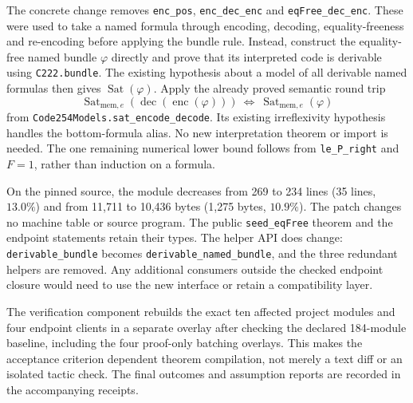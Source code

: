 The concrete change removes \texttt{enc\_pos}, \texttt{enc\_dec\_enc} and
\texttt{eqFree\_dec\_enc}. These were used to take a named formula through
encoding, decoding, equality-freeness and re-encoding before applying the
bundle rule. Instead, construct the equality-free named bundle $\varphi$
directly and prove that its interpreted code is derivable using
\texttt{C222.bundle}. The existing hypothesis about a model of all derivable
named formulas then gives $\operatorname{Sat}(\varphi)$. Apply the already proved
semantic round trip
\[
 \operatorname{Sat}_{\mathrm{mem},e}
       (\operatorname{dec}(\operatorname{enc}(\varphi)))
 \ \Longleftrightarrow\
 \operatorname{Sat}_{\mathrm{mem},e}(\varphi)
\]
from \texttt{Code254Models.sat\_encode\_decode}. Its existing irreflexivity
hypothesis handles the bottom-formula alias. No new interpretation theorem or
import is needed. The one remaining numerical lower bound follows from
\texttt{le\_P\_right} and $F=1$, rather than induction on a formula.

On the pinned source, the module decreases from 269 to 234 lines
(35 lines, $13.0\%$) and from 11,711 to 10,436 bytes
(1,275 bytes, $10.9\%$). The patch changes no machine table or source program.
The public \texttt{seed\_eqFree} theorem and the endpoint statements retain
their types. The helper API does change: \texttt{derivable\_bundle} becomes
\texttt{derivable\_named\_bundle}, and the three redundant helpers are removed.
Any additional consumers outside the checked endpoint closure would need to
use the new interface or retain a compatibility layer.

The verification component rebuilds the exact ten affected project modules
and four endpoint clients in a separate overlay after checking the declared
184-module baseline, including the four proof-only batching overlays.
This makes the acceptance criterion dependent theorem compilation,
not merely a text diff or an isolated tactic check. The final outcomes and
assumption reports are recorded in the accompanying receipts.
